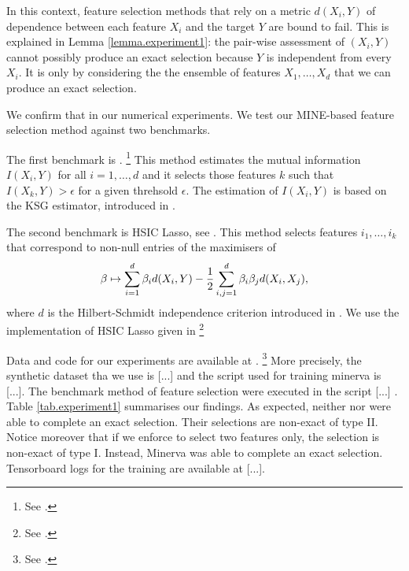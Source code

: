 In this context,
feature selection methods
that rely on a metric $d(X_i, Y)$ of dependence between 
each feature $X_i$ and the target $Y$ are bound to fail.
This is explained in Lemma \ref{lemma.experiment1}:
the pair-wise assessment of $(X_i, Y)$ 
cannot possibly produce an exact selection
because $Y$ is independent from every $X_i$. 
It is only by considering the the ensemble of features $X_1, \dots, X_d$ 
that we can produce an exact selection.

We confirm that in our numerical experiments. 
We test 
our MINE-based feature selection method 
against 
two benchmarks.

The first benchmark is 
.
\footnote{
See
.
}
This method estimates the mutual information 
$I(X_i, Y)$ for all $i = 1, \dots, d$
and 
it selects those features $k$ such that 
$I(X_k, Y) > \epsilon$
for a given threhsold $\epsilon$. 
The estimation of $I(X_i, Y)$ is based on the KSG estimator, 
introduced in 
\cite{KSG04est}.

The second benchmark is
HSIC Lasso,
see 
\cite{YJSXS14hig}.
This method 
selects features $i_1, \dots, i_k$
that correspond to non-null entries of the 
maximisers of 
\begin{equation*}
	\beta \mapsto 
	\sum_{i=1}^{d} \beta_i d(X_i, Y)
	-\frac{1}{2}
	\sum_{i,j = 1}^{d} \beta_i \beta_j d(X_i, X_j),
\end{equation*}
where $d$ is the Hilbert-Schmidt independence criterion 
introduced in 
\cite{GBSS05mea}.
We use the implementation of HSIC Lasso
given in
\footnote{
See .
}

Data and code for our experiments are available 
at
.
\footnote{
	See
.
}
More precisely, 
the synthetic dataset tha we use is
[...]
and 
the script used for training minerva is
[...].
The benchmark method of feature selection 
were
executed
in the script
[...]
.
Table
\ref{tab.experiment1}
summarises our findings. 
As expected, 
neither 
nor
were able to complete an exact selection. 
Their selections are non-exact of type II. 
Notice moreover that if we enforce 
to select two features only,
the selection is non-exact of type I.
Instead,
Minerva
was able to complete an exact selection.
Tensorboard logs for the training are available at
[...].


